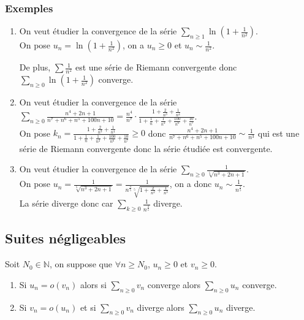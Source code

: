\documentclass[a4paper,10pt]{book} %
\newcommand{\N}{\mathbb{N}}
\newcommand{\displayAmath}{\displaystyle}
\begin{document}
\subsubsection{Exemples}\small
\begin{enumerate}
\item On veut étudier la convergence de la série $\displayAmath\sum_{n\geq 1}\ln(1+\frac{1}{n^2})$.\\
On pose $u_n=\ln(1+\frac{1}{n^2})$, on a $u_n\geq 0$ et $u_n\sim \frac{1}{n^2}$.

De plus, $\displayAmath\sum \frac{1}{n^2}$ est une série de Riemann convergente donc $\displayAmath\sum_{n\geq 0}\ln(1+\frac{1}{n^2})$ converge.

\item On veut étudier la convergence de la série $\displayAmath\sum_{n\geq 0}\frac{n^4+2n+1}{n^7+n^6+n^5+100n+10}=\frac{n^4}{n^7}\cdot\frac{1+\frac{2}{n^3}+\frac{1}{n^4}}{1+\frac{1}{n}+\frac{1}{n^2}+\frac{100}{n^6}+\frac{10}{n^7}}$.\\
On pose $\displayAmath k_n=\frac{1+\frac{2}{n^3}+\frac{1}{n^4}}{1+\frac{1}{n}+\frac{1}{n^2}+\frac{100}{n^6}+\frac{10}{n^7}}\geq 0$ donc $\displayAmath \frac{n^4+2n+1}{n^7+n^6+n^5+100n+10}\sim \frac{1}{n^3}$ qui est une série de Riemann convergente donc la série étudiée est convergente.

\item On veut étudier la convergence de la série $\displayAmath\sum_{n\geq 0}\frac{1}{\sqrt[5]{n^3+2n+1}}$.\\
On pose $\displayAmath u_n=\frac{1}{\sqrt[5]{n^3+2n+1}}=\frac{1}{n^{\frac{3}{5}}\sqrt[5]{1+\frac{2}{n^2}+\frac{1}{n^3}}}$, on a donc $u_n\sim \frac{1}{n^{\frac{3}{5}}}$.\\

La série diverge donc car $\displayAmath\sum_{k\geq 0}\frac{1}{n^{\frac{3}{5}}}$ diverge.
\end{enumerate}\normalsize

\subsection{Suites négligeables}
Soit $N_0\in\N$, on suppose que $\forall n\geq N_0$, $u_n\geq 0$ et $v_n\geq 0$.

\begin{enumerate}
\item Si $u_n=o(v_n)$ alors si $\sum_{n\geq 0}v_n$ converge alors $\sum_{n\geq 0}u_n$ converge.

\item Si $v_n=o(u_n)$ et si $\sum_{n\geq 0}v_n$ diverge alors $\sum_{n\geq 0} u_n$ diverge.
\end{enumerate}
\end{document}
